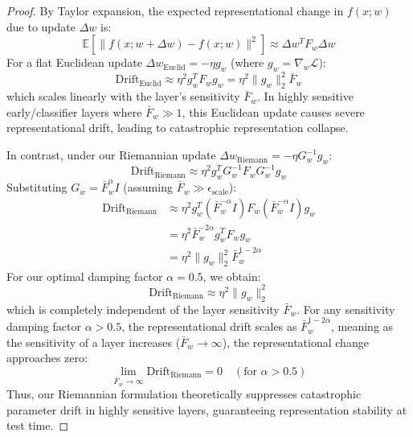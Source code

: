 \documentclass{article}
\theoremstyle{plain}
\theoremstyle{definition}
\theoremstyle{remark}
\begin{document}
\begin{proof}
By Taylor expansion, the expected representational change in $f(x; w)$ due to update $\Delta w$ is:
\begin{equation}
    \mathbb{E}\left[ \|f(x; w + \Delta w) - f(x; w)\|^2 \right] \approx \Delta w^T F_w \Delta w
\end{equation}
For a flat Euclidean update $\Delta w_{\text{Euclid}} = - \eta g_w$ (where $g_w = \nabla_w \mathcal{L}$):
\begin{equation}
    \text{Drift}_{\text{Euclid}} \approx \eta^2 g_w^T F_w g_w = \eta^2 \|g_w\|_2^2 \bar{F}_w
\end{equation}
which scales linearly with the layer's sensitivity $\bar{F}_w$. In highly sensitive early/classifier layers where $\bar{F}_w \gg 1$, this Euclidean update causes severe representational drift, leading to catastrophic representation collapse.

In contrast, under our Riemannian update $\Delta w_{\text{Riemann}} = - \eta G_w^{-1} g_w$:
\begin{equation}
    \text{Drift}_{\text{Riemann}} \approx \eta^2 g_w^T G_w^{-1} F_w G_w^{-1} g_w
\end{equation}
Substituting $G_w = \bar{F}_w^\alpha I$ (assuming $\bar{F}_w \gg \epsilon_{\text{scale}}$):
\begin{align}
    \text{Drift}_{\text{Riemann}} &\approx \eta^2 g_w^T \left(\bar{F}_w^{-\alpha} I\right) F_w \left(\bar{F}_w^{-\alpha} I\right) g_w \\
    &= \eta^2 \bar{F}_w^{-2\alpha} g_w^T F_w g_w \\
    &= \eta^2 \|g_w\|_2^2 \bar{F}_w^{1 - 2\alpha}
\end{align}
For our optimal damping factor $\alpha = 0.5$, we obtain:
\begin{equation}
    \text{Drift}_{\text{Riemann}} \approx \eta^2 \|g_w\|_2^2
\end{equation}
which is completely independent of the layer sensitivity $\bar{F}_w$. For any sensitivity damping factor $\alpha > 0.5$, the representational drift scales as $\bar{F}_w^{1-2\alpha}$, meaning as the sensitivity of a layer increases ($\bar{F}_w \to \infty$), the representational change approaches zero:
\begin{equation}
    \lim_{\bar{F}_w \to \infty} \text{Drift}_{\text{Riemann}} = 0 \quad (\text{for } \alpha > 0.5)
\end{equation}
Thus, our Riemannian formulation theoretically suppresses catastrophic parameter drift in highly sensitive layers, guaranteeing representation stability at test time.
\end{proof}
\end{document}
